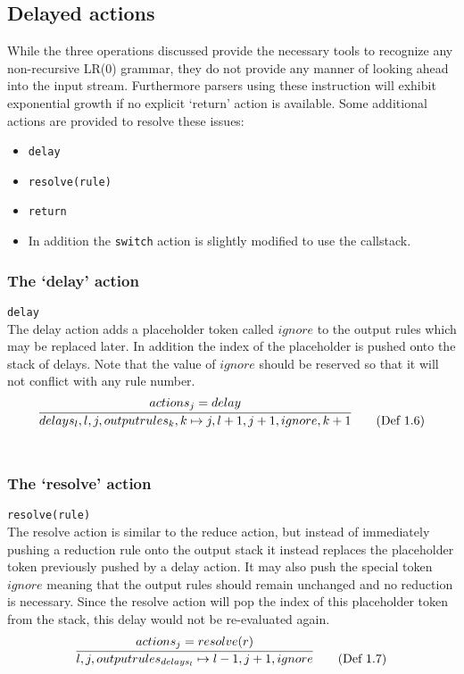 \documentclass[a4paper,11pt]{article}
\begin{document}
\subsection{Delayed actions}
While the three operations discussed provide the necessary tools to recognize any non-recursive LR(0) grammar, they do not provide any manner of looking ahead into the input stream. Furthermore parsers using these instruction will exhibit exponential growth if no explicit `return' action is available.
Some additional actions are provided to resolve these issues:
\begin{itemize}
\item \texttt{delay}
\item \texttt{resolve(rule)}
\item \texttt{return}
\item In addition the \texttt{switch} action is slightly modified to use the callstack.
\end{itemize}

\subsubsection{The `delay' action}
\texttt{delay}\\
The delay action adds a placeholder token called $ignore$ to the output rules which may be replaced later.
In addition the index of the placeholder is pushed onto the stack of delays.
Note that the value of $ignore$ should be reserved so that it will not conflict with any rule number.
\begin{equation}
\infer{delays_l, l, j, outputrules_k, k \mapsto j, l+1, j+1, ignore, k+1}{actions_j = delay} \tag{Def 1.6}
\end{equation}\\

\subsubsection{The `resolve' action}
\texttt{resolve(rule)}\\
The resolve action is similar to the reduce action, but instead of immediately pushing a reduction rule onto the output stack it instead replaces the placeholder token previously pushed by a delay action.
It may also push the special token $ignore$ meaning that the output rules should remain unchanged and no reduction is necessary. 
Since the resolve action will pop the index of this placeholder token from the stack, this delay would not be re-evaluated again.
\begin{equation}
\infer{l, j, outputrules_{delays_l} \mapsto l-1, j+1, ignore}{actions_j = resolve(r)} \tag{Def 1.7}
\end{equation}\\
\end{document}
